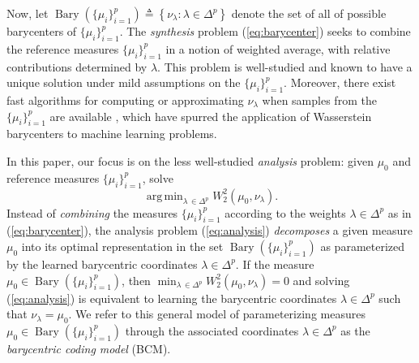 \documentclass[nohyperref]{article}
\DeclareMathOperator*{\argmin}{arg\,min}
\DeclareMathOperator*{\bary}{Bary}
\theoremstyle{definition}
\begin{document}
Now, let $\bary(\{\mu_i\}_{i=1}^p) \triangleq \left \{ \nu_{\lambda}: \lambda \in \Delta^p \right \}$ denote the set of all of possible barycenters of $\{\mu_i\}_{i=1}^p$. The \emph{synthesis} problem (\ref{eq:barycenter}) seeks to combine the reference measures $\{\mu_{i}\}_{i=1}^{p}$ in a notion of weighted average, with relative contributions determined by $\lambda$.  This problem is well-studied \citep{mccann1997convexity, agueh2011barycenters, kroshnin2019complexity} and known to have a unique solution under mild assumptions on the $\{\mu_{i}\}_{i=1}^{p}$.  Moreover, there exist fast algorithms for computing or approximating $\nu_{\lambda}$ when samples from the $\{\mu_{i}\}_{i=1}^{p}$ are available \citep{rabin2011wasserstein,cuturi2014fast,bonneel2015sliced, claici2018stochastic, yang2021fast}, which have spurred the application of Wasserstein barycenters to machine learning problems.

In this paper, our focus is on the less well-studied \emph{analysis} problem: given $\mu_0$ and reference measures $\{\mu_{i}\}_{i=1}^{p}$, solve
\begin{equation} \label{eq:analysis}
    \argmin_{\lambda\,\in\Delta^{p}} W_2^2\left ( \mu_0, \nu_{\lambda} \right ).
\end{equation}
Instead of \emph{combining} the measures $\{\mu_{i}\}_{i=1}^{p}$ according to the weights $\lambda\in\Delta^{p}$ as in (\ref{eq:barycenter}), the analysis problem (\ref{eq:analysis}) \emph{decomposes} a given measure $\mu_{0}$ into its optimal representation in the set $\bary(\{\mu_{i}\}_{i=1}^{p})$ as parameterized by the learned barycentric coordinates $\lambda\in\Delta^{p}$.  If the measure $\mu_0\in\bary(\{\mu_i\}_{i=1}^p)$, then $\min_{\lambda\,\in\Delta^{p}} W_2^2 ( \mu_0, \nu_{\lambda})=0$ and solving (\ref{eq:analysis}) is equivalent to learning the barycentric coordinates $\lambda\in\Delta^{p}$ such that $\nu_{\lambda}=\mu_{0}$. We refer to this general model of parameterizing measures $\mu_0 \in \bary(\{\mu_i\}_{i=1}^p)$ through the associated coordinates $\lambda\in\Delta^{p}$ as the \emph{barycentric coding model} (BCM).
\end{document}
